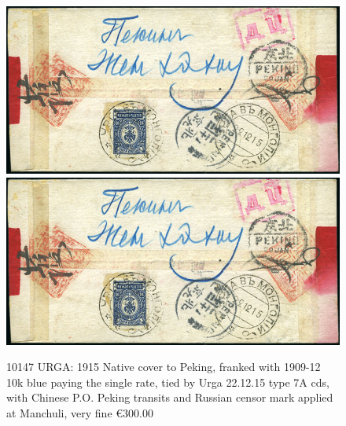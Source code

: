 \begin{figure}[htbp]
\centering
\includegraphics[width=.95\textwidth]{../russian-post-in-mongolia/10147.jpg}
\includegraphics[width=.95\textwidth]{../russian-post-in-mongolia/10147.jpg}
\caption{ 
10147 URGA: 1915 Native cover to Peking, franked with 1909-12 10k blue 
paying the single rate, tied by Urga 22.12.15 type 7A cds, with Chinese 
P.O. Peking transits and Russian censor mark applied at Manchuli, very fine
\euro 300.00 
} 
\end{figure}  

